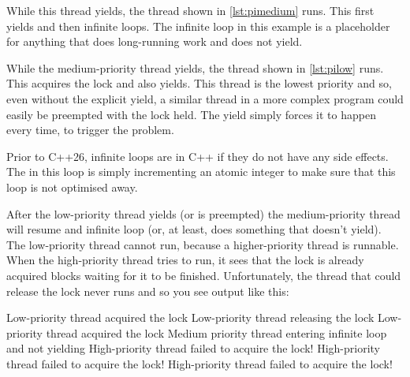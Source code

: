 \codelisting[filename=examples/priority_inheritance/priority_inheritance.cc,marker=high,label=lst:pihigh,caption="A high-priority thread that will be starved"]{}

While this thread yields, the thread shown in \ref{lst:pimedium} runs.
This first yields and then infinite loops.
The infinite loop in this example is a placeholder for anything that does long-running work and does not yield.

\codelisting[filename=examples/priority_inheritance/priority_inheritance.cc,marker=medium,label=lst:pimedium,caption="A medium-priority thread that will starve a high-priority thread"]{}

While the medium-priority thread yields, the thread shown in \ref{lst:pilow} runs.
This acquires the lock and also yields.
This thread is the lowest priority and so, even without the explicit yield, a similar thread in a more complex program could easily be preempted with the lock held.
The yield simply forces it to happen every time, to trigger the problem.

\begin{note}
	Prior to C++26, infinite loops are  in C++ if they do not have any side effects.
	The  in this loop is simply incrementing an atomic integer to make sure that this loop is not optimised away.
\end{note}

\codelisting[filename=examples/priority_inheritance/priority_inheritance.cc,marker=low,label=lst:pilow,caption="A low-priority thread that will be preempted with a lock held"]{}

After the low-priority thread yields (or is preempted) the medium-priority thread will resume and infinite loop (or, at least, does something that doesn't yield).
The low-priority thread cannot run, because a higher-priority thread is runnable.
When the high-priority thread tries to run, it sees that the lock is already acquired blocks waiting for it to be finished.
Unfortunately, the thread that could release the lock never runs and so you see output like this:

\begin{console}
Low-priority thread acquired the lock
Low-priority thread releasing the lock
Low-priority thread acquired the lock
Medium priority thread entering infinite loop and not yielding
High-priority thread failed to acquire the lock!
High-priority thread failed to acquire the lock!
High-priority thread failed to acquire the lock!
\end{console}

